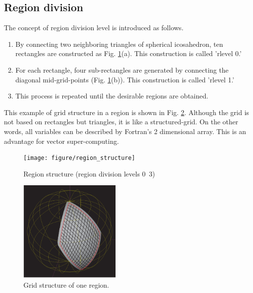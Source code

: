 \subsection{Region division}
The concept of region division level is introduced as follows.
\begin{enumerate}
  \item By connecting two neighboring triangles of spherical icosahedron, ten
    rectangles are constructed as Fig. \ref{fig:scale-gm_region_structure}(a). This construction is called 'rlevel
    0.'
  \item For each rectangle, four sub-rectangles are generated by connecting
    the diagonal mid-grid-points (Fig. \ref{fig:scale-gm_region_structure}(b)). This construction is called
    'rlevel 1.'
  \item This process is repeated until the desirable regions are obtained.
\end{enumerate}
This example of grid structure in a region is shown in Fig. \ref{fig:scale-gm_grid_structure}. Although the
grid is not based on rectangles but triangles, it is like a
structured-grid. On the other words, all variables can be described by
Fortran's 2 dimensional array. This is an advantage for vector super-computing.

\begin{figure}[H]
  \begin{center}
    \texttt{[image: figure/region\_structure]}
    \caption{Region structure (region division levels 0~3)}
    \label{fig:scale-gm_region_structure}
  \end{center}
\end{figure}

\begin{figure}[H]
  \begin{center}
    \includegraphics[width=5cm]{figure/grid_structure}
    \caption{Grid structure of one region.}
    \label{fig:scale-gm_grid_structure}
  \end{center}
\end{figure}


